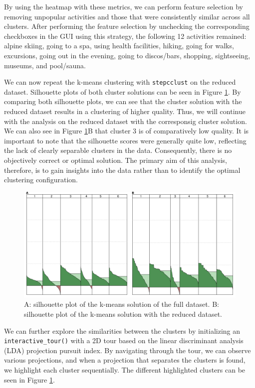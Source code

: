 \documentclass[article]{ajs}
\begin{document}
By using the heatmap with these metrics, we can perform feature selection by removing unpopular activities and those that were consistently similar across all clusters. After performing the feature selection by unchecking the corresponding checkboxes in the GUI using this strategy, the following 12 activities remained: alpine skiing, going to a spa, using health facilities, hiking, going for walks, excursions, going out in the evening, going to discos/bars, shopping, sightseeing, museums, and pool/sauna.

We can now repeat the k-means clustering with \texttt{stepcclust} on the reduced dataset. Silhouette plots of both cluster solutions can be seen in Figure \ref{fig:silhouette_comparison}. By comparing both silhouette plots, we can see that the cluster solution with the reduced dataset results in a clustering of higher quality. Thus, we will continue with the analysis on the reduced dataset with the corresponsig cluster solution. We can also see in Figure \ref{fig:silhouette_comparison}B that cluster 3 is of comparatively low quality. It is important to note that the silhouette scores were generally quite low, reflecting the lack of clearly separable clusters in the data. Consequently, there is no objectively correct or optimal solution. The primary aim of this analysis, therefore, is to gain insights into the data rather than to identify the optimal clustering configuration.

\begin{figure}[h!]
    \centering
    \includegraphics[width=1\textwidth]{silhouette_comparison.png}
    \caption{A: silhouette plot of the k-means solution of the full dataset. B: silhouette plot of the k-means solution with the reduced dataset.}
    \label{fig:silhouette_comparison}
\end{figure}

We can further explore the similarities between the clusters by initializing an \texttt{interactive\_tour()} with a 2D tour based on the linear discriminant analysis (LDA) projection pursuit index. By navigating through the tour, we can observe various projections, and when a projection that separates the clusters is found, we highlight each cluster sequentially. The different highlighted clusters can be seen in Figure \ref{fig:silhouette_comparison}.
\end{document}
